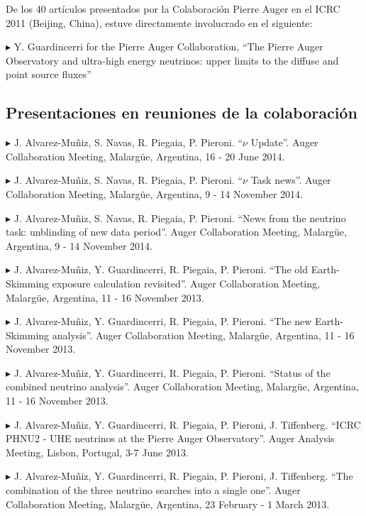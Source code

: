 \documentclass[letterpaper]{article}
\renewenvironment{itemize}{
  \begin{list}{}{
    \setlength{\leftmargin}{1.5em}
  }
}{
  \end{list}
}
\begin{document}
De los 40 artículos presentados por la Colaboración Pierre Auger en el ICRC 2011 (Beijing, China), estuve directamente involucrado en el siguiente:
 \begin{itemize}%
  \item{$\blacktriangleright$} Y. Guardincerri for the Pierre Auger Collaboration, ``The Pierre Auger Observatory and ultra-high energy neutrinos: upper limits to the diffuse and point source fluxes''
 \end{itemize}


\subsection*{Presentaciones en reuniones de la colaboración}       
\begin{itemize}\itemsep -1pt
  \item{$\blacktriangleright$} J. Alvarez-Muñiz, S. Navas, R. Piegaia, P. Pieroni. ``$\nu$ Update''. Auger Collaboration Meeting, Malargüe, Argentina, 16 - 20 June 2014.
  \item{$\blacktriangleright$} J. Alvarez-Muñiz, S. Navas, R. Piegaia, P. Pieroni. ``$\nu$ Task news''. Auger Collaboration Meeting, Malargüe, Argentina, 9 - 14 November 2014.
  \item{$\blacktriangleright$} J. Alvarez-Muñiz, S. Navas, R. Piegaia, P. Pieroni. ``News from the neutrino task: unblinding of new data period''. Auger Collaboration Meeting, Malargüe, Argentina, 9 - 14 November 2014.
  \item{$\blacktriangleright$} J. Alvarez-Muñiz, Y. Guardincerri, R. Piegaia, P. Pieroni. ``The old Earth-Skimming exposure calculation revisited''. Auger Collaboration Meeting, Malargüe, Argentina, 11 - 16 November 2013.
  \item{$\blacktriangleright$} J. Alvarez-Muñiz, Y. Guardincerri, R. Piegaia, P. Pieroni. ``The new Earth-Skimming analysis''. Auger Collaboration Meeting, Malargüe, Argentina, 11 - 16 November 2013.
  \item{$\blacktriangleright$} J. Alvarez-Muñiz, Y. Guardincerri, R. Piegaia, P. Pieroni. ``Status of the combined neutrino analysis''. Auger Collaboration Meeting, Malargüe, Argentina, 11 - 16 November 2013.
  \item{$\blacktriangleright$} J. Alvarez-Muñiz, Y. Guardincerri, R. Piegaia, P. Pieroni, J. Tiffenberg. ``ICRC PHNU2 - UHE neutrinos at the Pierre Auger Observatory''. Auger Analysis Meeting, Lisbon, Portugal, 3-7 June 2013.
  \item{$\blacktriangleright$} J. Alvarez-Muñiz, Y. Guardincerri, R. Piegaia, P. Pieroni, J. Tiffenberg. ``The combination of the three neutrino searches into a single one''. Auger Collaboration Meeting, Malargüe, Argentina, 23 February - 1 March 2013.

\end{itemize}
\end{document}
